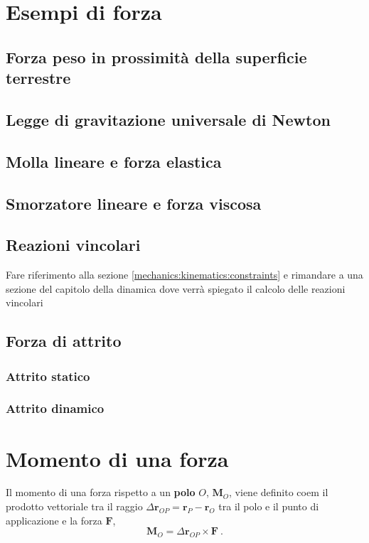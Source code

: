 \section{Esempi di forza}
\subsection{Forza peso in prossimità della superficie terrestre}
\subsection{Legge di gravitazione universale di Newton}
\subsection{Molla lineare e forza elastica}
\subsection{Smorzatore lineare e forza viscosa}
\subsection{Reazioni vincolari}
{\color{red} Fare riferimento alla sezione \ref{mechanics:kinematics:constraints} e rimandare a una sezione del capitolo della dinamica dove verrà spiegato il calcolo delle reazioni vincolari}
\subsection{Forza di attrito}
\subsubsection{Attrito statico}
\subsubsection{Attrito dinamico}

\section{Momento di una forza}
\begin{definition} Il momento di una forza rispetto a un \textbf{polo} $O$, $\mathbf{M}_O$, viene definito coem il prodotto vettoriale tra il raggio $\Delta \mathbf{r}_{OP} = \mathbf{r}_P - \mathbf{r}_O$ tra il polo e il punto di applicazione e la forza $\mathbf{F}$,
    \begin{equation} \mathbf{M}_O = \Delta \mathbf{r}_{OP} \times \mathbf{F} \ .
    \end{equation}
\end{definition}

